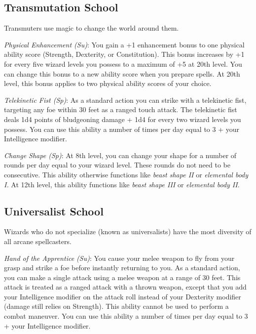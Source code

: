 \subsection{Transmutation School}

				
Transmuters use magic to change the world around them.
				
\textit{Physical Enhancement (Su)}: You gain a +1 enhancement bonus to one physical ability score (Strength, Dexterity, or Constitution). This bonus increases by +1 for every five wizard levels you possess to a maximum of +5 at 20th level. You can change this bonus to a new ability score when you prepare spells. At 20th level, this bonus applies to two physical ability scores of your choice.
				
\textit{Telekinetic Fist (Sp)}: As a standard action you can strike with a telekinetic fist, targeting any foe within 30 feet as a ranged touch attack. The telekinetic fist deals 1d4 points of bludgeoning damage + 1d4 for every two wizard levels you possess. You can use this ability a number of times per day equal to 3 + your Intelligence modifier.
				
\textit{Change Shape (Sp)}: At 8th level, you can change your shape for a number of rounds per day equal to your wizard level. These rounds do not need to be consecutive. This ability otherwise functions like \textit{beast shape II} or \textit{elemental body I.} At 12th level, this ability functions like \textit{beast shape III} or \textit{elemental body II}.
				
\subsection{Universalist School}

				
Wizards who do not specialize (known as universalists) have the most diversity of all arcane spellcasters.
				
\textit{Hand of the Apprentice (Su)}: You cause your melee weapon to fly from your grasp and strike a foe before instantly returning to you. As a standard action, you can make a single attack using a melee weapon at a range of 30 feet. This attack is treated as a ranged attack with a thrown weapon, except that you add your Intelligence modifier on the attack roll instead of your Dexterity modifier (damage still relies on Strength). This ability cannot be used to perform a combat maneuver. You can use this ability a number of times per day equal to 3 + your Intelligence modifier.
				
